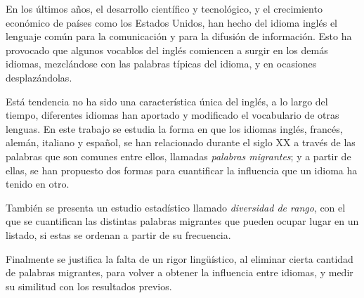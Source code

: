
\begin{abstracts}        

En los últimos años, el desarrollo científico y tecnológico,  y el crecimiento económico de países como los Estados Unidos,  han hecho del idioma inglés el lenguaje común para la comunicación y para la difusión de información. Esto ha provocado que algunos vocablos del inglés comiencen a surgir en los demás idiomas,  mezclándose con las palabras típicas del idioma, y en ocasiones desplazándolas.  

Está tendencia no ha sido una característica única del inglés, a lo largo del tiempo, diferentes idiomas han aportado y modificado el vocabulario de otras lenguas. En este trabajo se estudia la forma en que los idiomas inglés, francés, alemán, italiano y español, se han relacionado durante el siglo XX a través de las palabras que son comunes entre ellos, llamadas  \textit{palabras migrantes};  y a partir de ellas, se han propuesto dos formas para cuantificar la influencia que un idioma ha tenido en otro. 

También se presenta un estudio estadístico llamado \textit{diversidad de rango}, con el que se cuantifican las distintas palabras migrantes que pueden ocupar lugar en un listado, si estas se ordenan  a partir de su frecuencia.  

Finalmente se justifica la falta de un rigor lingüístico, al eliminar cierta cantidad de palabras migrantes, para volver a obtener la influencia entre idiomas, y medir su similitud con los resultados previos. 



 
\end{abstracts}


